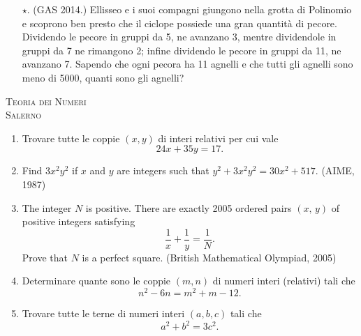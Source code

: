 \documentclass[a4paper]{article}
\theoremstyle{remark}
\theoremstyle{definition}
\begin{document}
\begin{enumerate}
	\item[$ \star. $] (GAS 2014.) Ellisseo e i suoi compagni giungono nella grotta di Polinomio e scoprono ben presto che il ciclope possiede una
	gran quantità di pecore. Dividendo le pecore in gruppi da 5, ne avanzano 3, mentre dividendole in gruppi da 7 ne
	rimangono 2; infine dividendo le pecore in gruppi da 11, ne avanzano 7. Sapendo che ogni pecora ha 11 agnelli e che
	tutti gli agnelli sono meno di 5000, quanti sono gli agnelli?
	
\end{enumerate}

\begin{center}
	\vspace*{0,5 cm}
	{\Huge \textsc{Teoria dei Numeri}} \\
	\vspace{0,5 cm}
	\textsc{Salerno}
	\thispagestyle{empty}
	\vspace{0,7 cm}
\end{center}
\normalsize




\begin{enumerate}
	\item Trovare tutte le coppie $ (x, y) $ di interi relativi per cui vale
	\[ 24x + 35y = 17. \]
	
	\item Find $ 3x^2y^2 $
	if $ x $ and $ y $ are integers such that $ y^2+ 3x^2y^2= 30x^2 + 517. $ (AIME, 1987)\\
	
	\item The integer $ N $ is positive. There are exactly 2005 ordered pairs $ (x,\, y) $ of positive integers satisfying
	\[ \frac{1}{x}+ \frac{1}{y} = \frac{1}{N}. \]
	Prove that $ N $ is a perfect square. (British Mathematical Olympiad, 2005)\\
	
	\item  Determinare quante sono le coppie $ (m, n) $ di numeri interi (relativi) tali che
	\[n^2 - 6n = m^2 + m - 12.\]
	
	\item  Trovare tutte le terne di numeri interi $ (a, b, c) $ tali che
	\[ a^2 + b^2 = 3c^2. \]
	
\end{enumerate}
\end{document}
